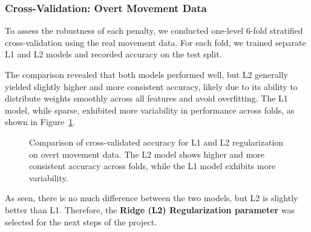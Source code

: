 \documentclass[
  letterpaper,
  DIV=11,
  numbers=noendperiod]{scrartcl}
\begin{document}
\subsubsection{Cross-Validation: Overt Movement
Data}\label{cross-validation-overt-movement-data}

To assess the robustness of each penalty, we conducted one-level 6-fold
stratified cross-validation using the real movement data. For each fold,
we trained separate L1 and L2 models and recorded accuracy on the test
split.

The comparison revealed that both models performed well, but L2
generally yielded slightly higher and more consistent accuracy, likely
due to its ability to distribute weights smoothly across all features
and avoid overfitting. The L1 model, while sparse, exhibited more
variability in performance across folds, as shown in
Figure~\ref{fig-l1_vs_l2_cv_accuracy}.

\begin{figure}


\caption{\label{fig-l1_vs_l2_cv_accuracy}Comparison of cross-validated
accuracy for L1 and L2 regularization on overt movement data. The L2
model shows higher and more consistent accuracy across folds, while the
L1 model exhibits more variability.}

\end{figure}%

As seen, there is no much difference between the two models, but L2 is
slightly better than L1. Therefore, the \textbf{Ridge (L2)
Regularization parameter} was selected for the next steps of the
project.
\end{document}
